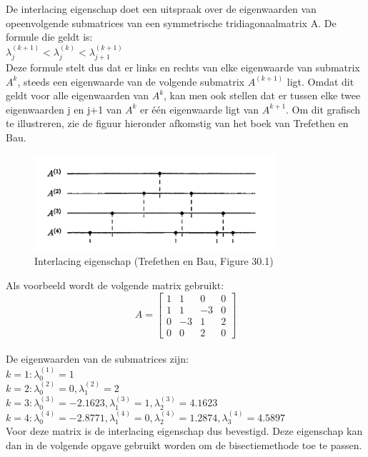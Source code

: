 De interlacing eigenschap doet een uitspraak over de eigenwaarden van opeenvolgende submatrices van een symmetrische tridiagonaalmatrix A. De formule die geldt is:\\[10pt]

$\lambda_{j}^{(k+1)} < \lambda_{j}^{(k)} < \lambda_{j+1}^{(k+1)}$\\[10pt]

Deze formule stelt dus dat er links en rechts van elke eigenwaarde van submatrix $A^{k}$, steeds een eigenwaarde van de volgende submatrix $A^{(k+1)}$ ligt. Omdat dit geldt voor alle eigenwaarden van $A^{k}$, kan men ook stellen dat er tussen elke twee eigenwaarden j en j+1 van $A^{k}$ er één eigenwaarde ligt van $A^{k+1}$. Om dit grafisch te illustreren, zie de figuur hieronder afkomstig van het boek van Trefethen en Bau.\\

\begin{figure}[H]
\includegraphics[width=0.8\textwidth]{Tekeningen/Interlacing.png}
  \centering
  \caption{Interlacing eigenschap (Trefethen en Bau, Figure 30.1)}
\end{figure}

Als voorbeeld wordt de volgende matrix gebruikt:\\

\[
A= 
\begin{bmatrix}
    1 & 1 & 0 & 0\\
    1 & 1 & -3 & 0\\
    0 & -3 & 1 & 2\\
    0 & 0 & 2 & 0
\end{bmatrix}
\]\\

De eigenwaarden van de submatrices zijn:\\

$k = 1: \lambda_{0}^{(1)} = 1$\\
$k = 2: \lambda_{0}^{(2)} = 0, \lambda_{1}^{(2)} = 2$\\
$k = 3: \lambda_{0}^{(3)} = -2.1623, \lambda_{1}^{(3)} = 1, \lambda_{2}^{(3)} = 4.1623$\\
$k = 4: \lambda_{0}^{(4)} = -2.8771, \lambda_{1}^{(4)} = 0, \lambda_{2}^{(4)} = 1.2874, \lambda_{3}^{(4)} = 4.5897$\\[10pt]

Voor deze matrix is de interlacing eigenschap dus bevestigd. Deze eigenschap kan dan in de volgende opgave gebruikt worden om de bisectiemethode toe te passen.\\

